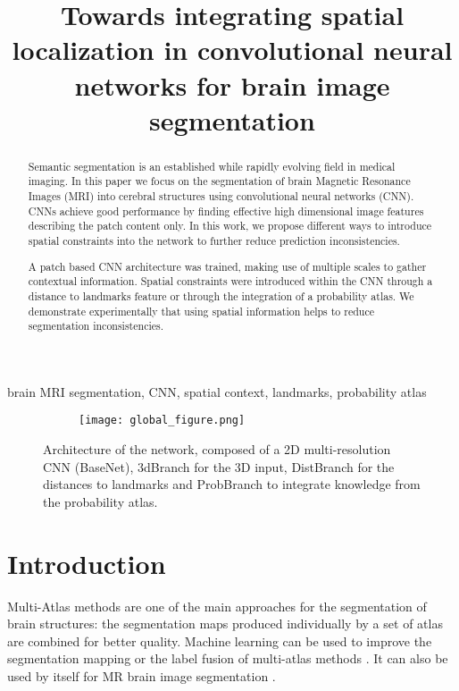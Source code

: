 \documentclass{article}
\title{Towards integrating spatial localization in convolutional neural networks for brain image segmentation}
\begin{document}
%
\maketitle
%
\begin{abstract}
Semantic segmentation is an established while rapidly evolving field in medical imaging.
In this paper we focus on the segmentation of brain Magnetic Resonance Images (MRI) into cerebral structures using convolutional neural networks (CNN). CNNs achieve good performance by finding effective high dimensional image features describing the patch content only. In this work, we propose different ways to introduce spatial constraints into the network to further reduce prediction inconsistencies.

A patch based CNN architecture was trained, making use of multiple scales to gather contextual information.
Spatial constraints were introduced within the CNN through a distance to landmarks feature or through the integration of a probability atlas.
We demonstrate experimentally that using spatial information helps to reduce segmentation inconsistencies.

\end{abstract}
%
\begin{keywords}
brain MRI segmentation, CNN, spatial context, landmarks, probability atlas
\end{keywords}
%

\begin{figure*}[!h]
  \begin{subfigure}{1\linewidth}
  	\centering
    \texttt{[image: global\_figure.png]}
  \end{subfigure}
  \caption{Architecture of the network, composed of a 2D multi-resolution CNN (BaseNet), 3dBranch for the 3D input, DistBranch for the distances to landmarks and ProbBranch to integrate knowledge from the probability atlas.}
  \label{fig:cnnarch}
\end{figure*}

\section{Introduction}
\label{sec:intro}
Multi-Atlas methods\cite{HECKEMANN2006115, mindboogle} are one of the main approaches for the segmentation of brain structures: the segmentation maps produced individually by a set of atlas are combined for better quality. Machine learning can be used to improve the segmentation mapping or the label fusion of multi-atlas methods \cite{SDIK-15b,wang2013multi}. It can also be used by itself for MR brain image segmentation \cite{Stollenga:2015:PML:2969442.2969574,DBLP:journals/corr/RoyCSKNW17,moeskops_automatic_2016}. \newline
\end{document}
